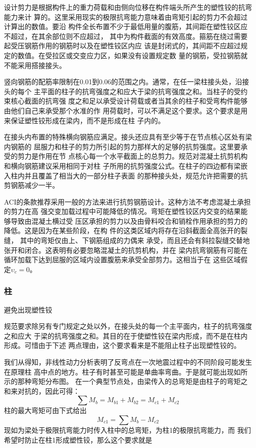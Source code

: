 \documentclass[12pt,a4paper]{book}
\begin{document}
设计剪力是根据构件上的重力荷载和由侧向位移在构件端头所产生的塑性铰的抗弯能力来计
算的。这里采用现实的极限抗弯能力意味着由弯矩引起的剪力不会超过计算出的数值。要沿
构件全长布置不少于最低用量的腹筋，其间距在塑性铰区应不超过，在其余部位则不应超过，
其中为构件截面的有效高度。箍筋在绕过需要起受压钢筋作用的钢筋时以及在塑性铰区内应
该是封闭式的，其间距不应超过规定的数值。在受拉区或交变应力区，如果没有设置规定数
量的钢筋，受拉钢筋就不能采用搭接接头。

竖向钢筋的配筋率限制在0.01到0.06的范围之内。通常，在任一梁柱接头处，沿接头的每个
主平面的柱子的抗弯强度之和应大于梁的抗弯强度之和。当柱子的受约束核心截面的抗弯强
度之和足以承受设计荷载或者当其余的柱子和受弯构件能够由他们自己来承受那个水准的作
用荷载时，可以不满足这个要求。这个要求是用来保证塑性铰形成在梁内，而不是形成在柱
子内的。

在接头内布置的特殊横向钢筋应满足。接头还应具有至少等于在节点核心区处有梁内钢筋的
屈服力和柱子的剪力所引起的剪力那样大的足够的抗剪强度。这里要承受的剪力是作用在节
点核心每一个水平截面上的总剪力。规范对混凝土抗剪机构和横向钢筋建议采用相同于对柱
子所用的抗剪强度公式。在柱子的四边都有梁嵌入柱内并且覆盖了相当大的一部分柱子表面
的那种接头处，规范允许把需要的抗剪钢筋减少一半。

ACI的条款推荐采用一般的方法来进行抗剪钢筋设计。这种方法不考虑混凝土承担的剪力在高
强交变加载过程中可能降低的情况。弯矩在塑性铰区内交变的结果能够导致由混凝土横过受
压区承担的剪力以及由骨料咬合和销栓作用承担的剪力的降低。这是因为在某些阶段，在构
件的这类区域内将存在沿斜截面全高张开的裂缝， 其中的弯矩仅由上、下钢筋组成的力偶来
承受，而且还会有斜拉裂缝交替地张开和闭合。这表明有必要忽略混凝土的抗剪机构，并在
梁内抗弯钢筋有可能在循环加载下达到屈服的区域内设置腹筋来承受全部剪力。这相当于在
这些区域假定$\upsilon_c=0$。

\subsubsection{柱}

避免出现塑性铰

规范要求除另有专门规定之处以外，在接头处的每一个主平面内，柱子的抗弯强度之和应大
于梁的抗弯强度之和。其目的在于使塑性铰在梁内形成，而不是在柱内形成。可惜由于下述
两点理由，这个要求看来是不能阻止柱子出现塑性铰的。

我们从得知，非线性动力分析表明了反弯点在一次地震过程中的不同阶段可能发生在原理柱
高中点的地方。柱子有时甚至可能是单曲率弯曲。于是就可能出现如所示的那种弯矩分布图。
在一个典型节点处，由梁传入的总弯矩是由柱子的弯矩之和来对抗的，因此可得：
\begin{equation*} \sum M_b=M_{b1}+M_{b2}=M_{c1}+M_{c2}
\end{equation*}柱的最大弯矩可由下式给出
\begin{equation}
  \label{eq:31} M_{c1}=\sum M_{b}-M_{c2}
\end{equation}现如为梁处于极限抗弯能力时传入柱中的总弯矩，为柱1的极限抗弯能力，而
我们希望时防止在柱1形成塑性铰，那么这个要求就是
\end{document}
